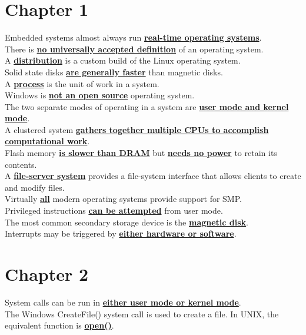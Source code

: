\documentclass[10pt]{article}
\newcommand{\qw}[1]{\textbf{\ul{#1}}}
\begin{document}
\section*{\centering Chapter 1}
Embedded systems almost always run \qw{real-time operating systems}.\\[2mm]
There is \qw{no universally accepted definition} of an operating system.\\[2mm]
A \qw{distribution} is a custom build of the Linux operating system.\\[2mm]
Solid state disks \qw{are generally faster} than magnetic disks.\\[2mm]
A \qw{process} is the unit of work in a system.\\[2mm]
Windows is \qw{not an open source} operating system.\\[2mm]
The two separate modes of operating in a system are \qw{user mode and kernel mode}.\\[2mm]
A clustered system \qw{gathers together multiple CPUs to accomplish computational work}.\\[2mm]
Flash memory \qw{is slower than DRAM} but \qw{needs no power} to retain its contents.\\[2mm]
A \qw{file-server system} provides a file-system interface that allows clients to create and modify files.\\[2mm]
Virtually \qw{all} modern operating systems provide support for SMP.\\[2mm]
Privileged instructions \qw{can be attempted} from user mode.\\[2mm]
The most common secondary storage device is the \qw{magnetic disk}.\\[2mm]
Interrupts may be triggered by \qw{either hardware or software}.
\newpage



\section*{\centering Chapter 2}
System calls can be run in \qw{either user mode or kernel mode}.\\[2mm]
The Windows CreateFile() system call is used to create a file. In UNIX, the equivalent function is \qw{open()}.\\[2mm]
\newpage
\end{document}
